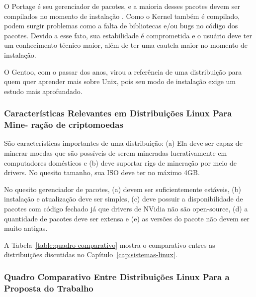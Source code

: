 \documentclass[
article,			%
12pt,				%
openright,			%
oneside,			%
a4paper,			%
chapter=TITLE,		%
section=TITLE,		%
subsection=TITLE,	%
subsubsection=TITLE,%
subsubsubsection=TITLE, %
english,			%
brazil,				%
]{abntex2}
\begin{document}
O Portage é seu gerenciador de pacotes, e a maioria desses pacotes
devem ser compilados no momento de instalação \cite{GentooWiki2018}.
Como o Kernel também é compilado, podem surgir problemas como a falta
de bibliotecas e/ou bugs no código dos pacotes. Devido a esse fato,
sua estabilidade é comprometida e o usuário deve ter um conhecimento
técnico maior, além de ter uma cautela maior no momento de instalação.

O Gentoo, com o passar dos anos, virou a referência de uma
distribuição para quem quer aprender mais sobre Unix, pois seu modo de
instalação exige um estudo mais aprofundado.

\subsubsection{Características Relevantes em Distribuições Linux Para Mine-
ração de criptomoedas}

São características importantes de uma distribuição: (a) Ela deve ser
capaz de minerar moedas que são possíveis de serem mineradas
lucrativamente em computadores domésticos e (b) deve suportar rigs de
mineração por meio de drivers. No quesito tamanho, sua ISO deve ter no
máximo 4GB\@.

No quesito gerenciador de pacotes, (a) devem ser suficientemente
estáveis, (b) instalação e atualização deve ser simples, (c) deve
possuir a disponibilidade de pacotes com código fechado já que drivers
de NVidia não são open-source, (d) a quantidade de pacotes deve ser
extensa e (e) as versões do pacote não devem ser muito antigas.

A Tabela~\ref{table:quadro-comparativo} mostra o comparativo entres as
distribuições discutidas no Capítulo~\ref{cap:sistemas-linux}.

\subsubsection{Quadro Comparativo Entre Distribuições Linux Para a
Proposta do Trabalho}
\end{document}
